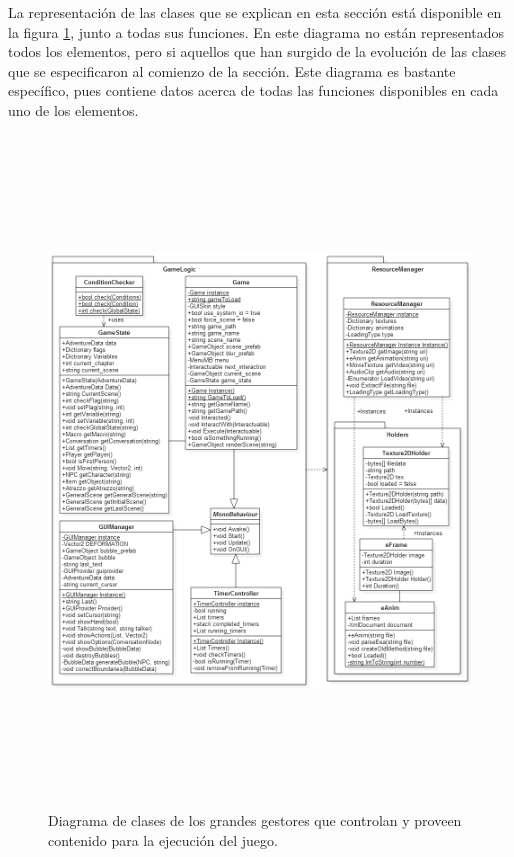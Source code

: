 La representación de las clases que se explican en esta sección está disponible en la figura \ref{runnerbigit2}, junto a todas sus funciones. En este diagrama no están representados todos los elementos, pero si aquellos que han surgido de la evolución de las clases que se especificaron al comienzo de la sección. Este diagrama es bastante específico, pues contiene datos acerca de todas las funciones disponibles en cada uno de los elementos.

\begin{figure}[h]
	\centerline{\includegraphics[height=7in]{figures/it2/GameLogicBigOnes.png}}
	\caption[GameLogic Grandes Gestores - Versión Final]{Diagrama de clases de los grandes gestores que controlan y proveen contenido para la ejecución del juego.}
	\label{runnerbigit2}
\end{figure}

\newpage



